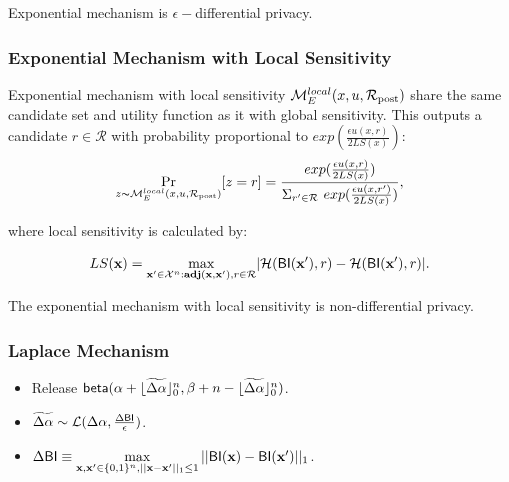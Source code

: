 \documentclass[sigconf]{acmart}
\begin{document}
Exponential mechanism is $\epsilon -$differential privacy\cite{dwork2014algorithmic}.


\subsubsection{Exponential Mechanism with Local Sensitivity}
\label{subsec_emls}
Exponential mechanism with local sensitivity $\mathcal{M}_E^{local}({x},{u},{\mathcal{R}_{\textup{post}}})$ share the same candidate set and utility function as it with global sensitivity. This outputs a candidate $r \in \mathcal{R}$ with probability proportional to $exp(\frac{\epsilon u(x,r)}{2 LS(x)})$:
\begin{equation*}
\underset{z \thicksim \mathcal{M}_E^{local}({x},{u},{\mathcal{R}_{\textup{post}}})}{\Pr}[z=r] = \frac
{exp(\frac{\epsilon u(x,r)}{2 LS(x)})}
{\Sigma_{r' \in \mathcal{R}}\ exp(\frac{\epsilon u(x,r')}{2 LS(x)})},
\end{equation*}

where local sensitivity is calculated by:

\begin{equation*}
LS(\textbf{x})=\max_{\textbf{x}' \in \mathcal{X}^n:\textbf{adj}(\textbf{x},\textbf{x}'), r\in \mathcal{R}}\lvert \mathcal{H}(\mathsf{BI}(\textbf{x}'), r) - \mathcal{H}(\mathsf{BI}(\textbf{x}'), r)\rvert.
\end{equation*}

The exponential mechanism with local sensitivity is non-differential privacy\cite{dwork2014algorithmic}.



\subsubsection{Laplace Mechanism}
\begin{itemize}
  \item Release $\mathsf{beta}(\alpha +  \lfloor\widetilde{\Delta \alpha}\rfloor^n_0,\beta + n - \lfloor\widetilde{\Delta \alpha}\rfloor^n_0)$.
  \item $\widetilde{\Delta \alpha}\sim \mathcal{L}(\Delta\alpha, \frac{\Delta \mathsf{BI}}{\epsilon})$.
  \item $\Delta \mathsf{BI} \equiv \max\limits_{\textbf{x}, \textbf{x}' \in \{0,1\}^{n}, ||\textbf{x} - \textbf{x}'||_1 \leq 1} ||\mathsf{BI}(\textbf{x}) - \mathsf{BI}(\textbf{x}')||_1$.
  \end{itemize}
\end{document}
